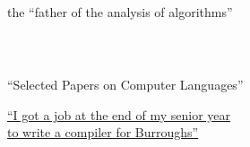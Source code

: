 
\begin{frame}{}
\end{frame}

\begin{frame}{}
  \begin{center}
    {\large the ``father of the analysis of algorithms''}
  \end{center}

  \begin{columns}
  \end{columns}

  \pause
  \vspace{0.30cm}
  \begin{center}
     \\[6pt]
  \end{center}


\end{frame}

\begin{frame}{}
  \begin{center}
    ``Selected Papers on Computer Languages''


  \end{center}
\end{frame}

\begin{frame}{}
  \begin{center}

    \vspace{0.50cm}
    \href{https://youtu.be/QeiuVNDQg4k}{``I got a job at the end of my senior year 
    \\ to write a compiler for Burroughs''}
  \end{center}
\end{frame}

